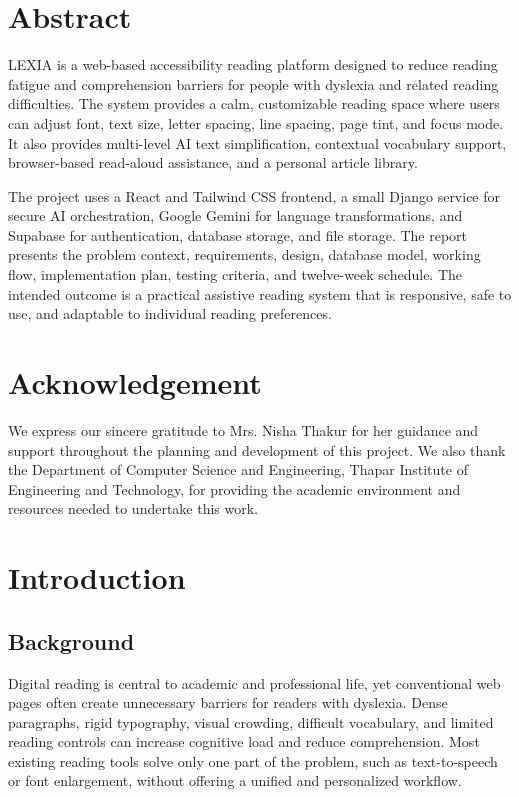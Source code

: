 \documentclass[a4paper]{tietreport}
\author{%
  \texttt{1024170445} \quad Nandini Sharma, CSED \\
  \texttt{1024170435} \quad Divyadeep Singh, CSED%
}
\begin{document}
\maketitle

\chapter*{Abstract}
LEXIA is a web-based accessibility reading platform designed to reduce reading fatigue and comprehension barriers for people with dyslexia and related reading difficulties. The system provides a calm, customizable reading space where users can adjust font, text size, letter spacing, line spacing, page tint, and focus mode. It also provides multi-level AI text simplification, contextual vocabulary support, browser-based read-aloud assistance, and a personal article library.

The project uses a React and Tailwind CSS frontend, a small Django service for secure AI orchestration, Google Gemini for language transformations, and Supabase for authentication, database storage, and file storage. The report presents the problem context, requirements, design, database model, working flow, implementation plan, testing criteria, and twelve-week schedule. The intended outcome is a practical assistive reading system that is responsive, safe to use, and adaptable to individual reading preferences.

\chapter*{Acknowledgement}
We express our sincere gratitude to Mrs. Nisha Thakur for her guidance and support throughout the planning and development of this project. We also thank the Department of Computer Science and Engineering, Thapar Institute of Engineering and Technology, for providing the academic environment and resources needed to undertake this work.

\tableofcontents
{}

\chapter{Introduction}
\section{Background}
Digital reading is central to academic and professional life, yet conventional web pages often create unnecessary barriers for readers with dyslexia. Dense paragraphs, rigid typography, visual crowding, difficult vocabulary, and limited reading controls can increase cognitive load and reduce comprehension. Most existing reading tools solve only one part of the problem, such as text-to-speech or font enlargement, without offering a unified and personalized workflow.
\end{document}
